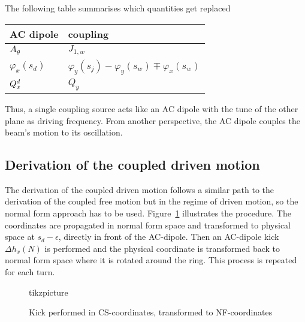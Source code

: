 %
The following table summarises which quantities get replaced
\begin{center}
\begin{tabular}{ll}
    AC dipole & coupling \\
    \hline
    \hline
    $ A_\theta $        & $ J_{1,w} $ \\
    $ \varphi_x(s_d) $  & $ \varphi_y(s_j) - \varphi_y(s_w) \mp \varphi_x(s_w)$ \\
    $ Q^{d}_{x} $          & $ Q_y $\\
    \hline
\end{tabular}
\end{center}
Thus, a single coupling source acts like an AC dipole with the tune of the other plane as driving frequency.
From another perspective, the AC dipole couples the beam's motion to its oscillation.

\subsection{Derivation of the coupled driven motion}


The derivation of the coupled driven motion follows a similar path to the derivation of the 
coupled free motion but in the regime of driven motion, so the normal form approach has to be used.
Figure~\ref{fig_sketch_drv_ac} illustrates the procedure. The coordinates are propagated in normal form
space and transformed to physical space at $s_d-\epsilon$, directly in front of the AC-dipole. Then
an AC-dipole kick $\Delta h_x(N)$ is performed and the physical coordinate is transformed back to
normal form space where it is rotated around the ring. This process is repeated for each turn.

\begin{figure}
  \centering
  tikzpicture
      \caption{Kick performed in CS-coordinates, transformed to NF-coordinates}
  \label{fig_sketch_drv_ac}
\end{figure}

